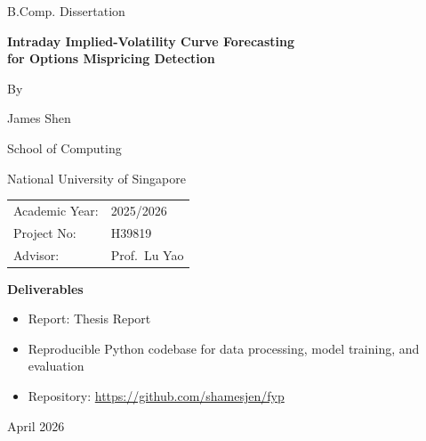 \documentclass[12pt]{report}
\begin{document}
\begin{titlepage}
\thispagestyle{empty}
\centering

\vspace*{1.5cm}

{\Large B.Comp. Dissertation\par}
\vspace{1.2cm}

{\Huge\bfseries Intraday Implied-Volatility Curve Forecasting\\[0.25em]
for Options Mispricing Detection\\[0.25em]\par}

\vspace{1.4cm}

{\Large By\par}
\vspace{0.4cm}
{\Large James Shen\par}

\vspace{0.6cm}
{\large School of Computing\par}
{\large National University of Singapore\par}

\vspace{1.0cm}

\begin{tabular}{@{}ll@{}}
Academic Year: & 2025/2026 \\
Project No:    & H39819 \\
Advisor:       & Prof.\ Lu Yao \\
\end{tabular}

\vspace{1.2cm}

\begin{minipage}{0.78\textwidth}
\textbf{Deliverables}
\begin{itemize}[leftmargin=1.4cm,itemsep=0.2em,topsep=0.2em]
    \item Report: Thesis Report
    \item Reproducible Python codebase for data processing, model training, and evaluation
    \item Repository: \url{https://github.com/shamesjen/fyp}
\end{itemize}
\end{minipage}

\vfill

{\large April 2026\par}

\end{titlepage}
\end{document}
